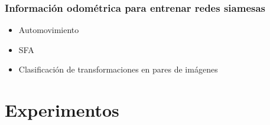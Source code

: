 \documentclass{beamer}
\begin{document}
\begin{frame}
\frametitle{Información odométrica para entrenar redes siamesas}
\begin{itemize}
    \item Automovimiento 
    \item SFA 
    \item Clasificación de transformaciones en pares de imágenes 
\end{itemize}
\end{frame}





\section{Experimentos}
\end{document}

